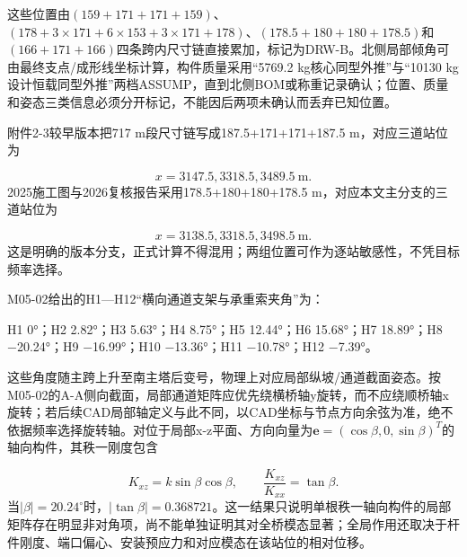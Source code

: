 \documentclass[UTF8,a4paper,11pt,fontset=none]{ctexart}
\begin{document}
\endgroup
这些位置由\((159+171+171+159)\)\allowbreak{}、\((178+3\times171+6\times153+3\times171+178)\)\allowbreak{}、\((178.5+180+180+178.5)\)\allowbreak{}和\((166+171+166)\)\allowbreak{}四条跨内尺寸链直接累加，标记为DRW-B。北侧局部倾角可由最终支点/成形线坐标计算，构件质量采用“5769.2 kg核心同型外推”与“10130 kg设计恒载同型外推”两档ASSUMP，直到北侧BOM或称重记录确认；位置、质量和姿态三类信息必须分开标记，不能因后两项未确认而丢弃已知位置。\par
附件2-3较早版本把717 m段尺寸链写成187.5+171+171+187.5 m，对应三道站位为\par
\[
x=3147.5, 3318.5, 3489.5\ \mathrm{m}.
\]
2025施工图与2026复核报告采用178.5+180+180+178.5 m，对应本文主分支的三道站位为\par
\[
x=3138.5, 3318.5, 3498.5\ \mathrm{m}.
\]
这是明确的版本分支，正式计算不得混用；两组位置可作为逐站敏感性，不凭目标频率选择。\par
M05-02给出的H1—H12“横向通道支架与承重索夹角”为：\par
H1 0°；H2 2.82°；H3 5.63°；H4 8.75°；H5 12.44°；H6 15.68°；H7 18.89°；H8 −20.24°；H9 −16.99°；H10 −13.36°；H11 −10.78°；H12 −7.39°。\par
这些角度随主跨上升至南主塔后变号，物理上对应局部纵坡/通道截面姿态。按M05-02的A-A侧向截面，局部通道矩阵应优先绕横桥轴y旋转，而不应绕顺桥轴x旋转；若后续CAD局部轴定义与此不同，以CAD坐标与节点方向余弦为准，绝不依据频率选择旋转轴。对位于局部x-z平面、方向向量为\(\mathbf e=(\cos\beta,\allowbreak 0,\allowbreak \sin\beta)^T\)\allowbreak{}的轴向构件，其秩一刚度包含\par
\[
K_{xz}=k\sin\beta\cos\beta,
\qquad
\frac{K_{xz}}{K_{xx}}=\tan\beta.
\]
当\(|\beta|=20.24^\circ\)\allowbreak{}时，\(|\tan\beta|=0.368721\)\allowbreak{}。这一结果只说明单根秩一轴向构件的局部矩阵存在明显非对角项，尚不能单独证明其对全桥模态显著；全局作用还取决于杆件刚度、端口偏心、安装预应力和对应模态在该站位的相对位移。\par
{}
\end{document}
